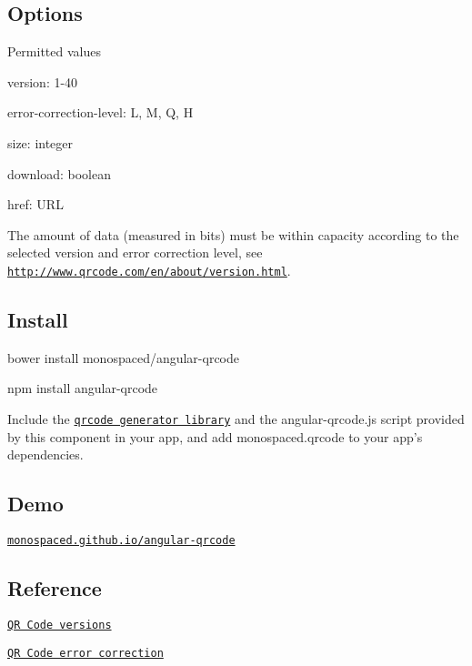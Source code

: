 \subsection*{Options }

Permitted values


\begin{DoxyItemize}
\item version\+: 1-\/40
\item error-\/correction-\/level\+: \textquotesingle{}L\textquotesingle{}, \textquotesingle{}M\textquotesingle{}, \textquotesingle{}Q\textquotesingle{}, \textquotesingle{}H\textquotesingle{}
\item size\+: integer
\item download\+: boolean
\item href\+: U\+RL
\end{DoxyItemize}

The amount of data (measured in bits) must be within capacity according to the selected version and error correction level, see \href{http://www.qrcode.com/en/about/version.html}{\tt http\+://www.\+qrcode.\+com/en/about/version.\+html}.

\subsection*{Install }

\begin{DoxyVerb}bower install monospaced/angular-qrcode

npm install angular-qrcode
\end{DoxyVerb}


Include the \href{https://raw.github.com/monospaced/bower-qrcode-generator/master/js/qrcode.js}{\tt qrcode generator library} and the {\ttfamily angular-\/qrcode.\+js} script provided by this component in your app, and add {\ttfamily monospaced.\+qrcode} to your app’s dependencies.

\subsection*{Demo }

\href{http://monospaced.github.io/angular-qrcode}{\tt monospaced.\+github.\+io/angular-\/qrcode}

\subsection*{Reference }

\href{http://www.qrcode.com/en/about/version.html}{\tt QR Code versions}

\href{http://www.qrcode.com/en/about/error_correction.html}{\tt QR Code error correction} 